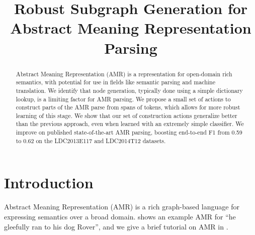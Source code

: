 \documentclass[11pt]{article}
\title{Robust Subgraph Generation for Abstract Meaning Representation Parsing}
\author{
}
\date{}
\begin{document}
\maketitle
\begin{abstract}


Abstract Meaning Representation (AMR) is a representation for open-domain rich semantics, with potential for use in fields like semantic parsing
  and machine translation.
We identify that node generation, typically done using a simple
  dictionary lookup, is a limiting factor for AMR parsing.
We propose a small set of actions to construct parts of the AMR parse from spans of tokens, which allows for more robust learning of this stage.
We show that our set of construction actions generalize better than the previous approach, even when learned with an extremely simple classifier.
We improve on published state-of-the-art AMR parsing, boosting end-to-end F1 from 0.59 to 0.62 on the LDC2013E117 and LDC2014T12 datasets.

\end{abstract}

\section{Introduction}


Abstract Meaning Representation (AMR) \cite{Banarescu:13} is a rich graph-based language for expressing semantics over a broad domain.
 shows an example AMR for ``he gleefully ran to his dog Rover'', and we give a brief tutorial on AMR in .
\end{document}
